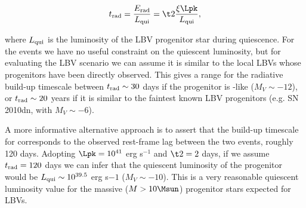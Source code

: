\begin{equation}
  \label{eqn:trad}
t_{\rm rad} = \frac{E_{\rm rad}}{L_{\rm qui}} = \t2 \frac{\xi\Lpk}{L_{\rm qui}},
\end{equation}

\noindent where $L_{\rm qui}$ is the luminosity of the LBV progenitor
star during quiescence. For the \spock events we have no useful
constraint on the quiescent luminosity, but for evaluating the LBV
scenario we can assume it is similar to the local LBVs whose
progenitors have been directly observed.  This gives a range for the
radiative build-up timescale between $t_{\rm rad}\sim30$ days if the
progenitor is \etacar-like ($M_V\sim-12$), or $t_{\rm rad}\sim20$
years if it is similar to the faintest known LBV progenitors (e.g. SN
2010dn, with $M_V\sim-6$).  

A more informative alternative approach is to assert that the build-up
timescale for \spock corresponds to the observed rest-frame lag
between the two events, roughly 120 days. Adopting $\Lpk=10^{41}$ erg
s$^{-1}$ and $\t2=2$ days, if we assume $t_{\rm rad}=120$ days we can
infer that the quiescent luminosity of the \spock progenitor would be
$L_{\rm qui}\sim10^{39.5}$ erg s${-1}$ ($M_V\sim-10$).  This is a very
reasonable quiescent luminosity value for the massive ($M>10\Msun$)
progenitor stars expected for LBVs.

